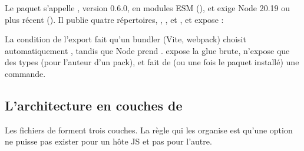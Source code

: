 Le paquet s'appelle , version 0.6.0, en modules ESM (), et exige Node 20.19 ou plus récent (). Il publie quatre répertoires, , ,  et , et expose :


La condition  de l'export  fait qu'un bundler (Vite, webpack) choisit automatiquement , tandis que Node prend .  expose la glue brute,  n'expose que des types (pour l'auteur d'un pack), et  fait de  (ou  une fois le paquet installé) une commande.

\subsection{L'architecture en couches de }

Les fichiers de  forment trois couches. La règle qui les organise est qu'une option ne puisse pas exister pour un hôte JS et pas pour l'autre.

